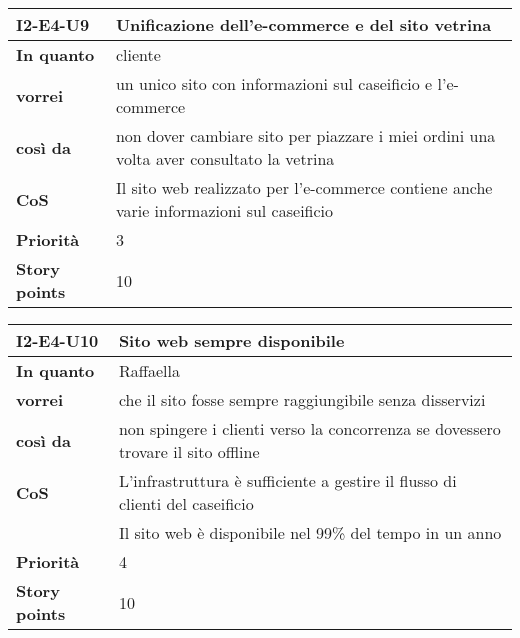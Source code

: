 \begin{table}[H]
  \begin{tabularx}{\textwidth}{lX}
    \toprule
    \textbf{I2-E4-U9} & \textbf{Unificazione dell'e-commerce e del sito vetrina} \\
    \midrule
    \textbf{In quanto} & cliente \\
    \textbf{vorrei} & un unico sito con informazioni sul caseificio e l'e-commerce \\
    \textbf{così da} & non dover cambiare sito per piazzare i miei ordini una volta aver consultato la vetrina \\
    \midrule
    \textbf{CoS} & Il sito web realizzato per l'e-commerce contiene anche varie informazioni sul caseificio \\ 
    \midrule
    \textbf{Priorità} & 3 \\
    \textbf{Story points} & 10 \\
    \bottomrule
  \end{tabularx}
  \label{user-story:i2-e4-u9}
\end{table}

\begin{table}[H]
  \begin{tabularx}{\textwidth}{lX}
    \toprule
    \textbf{I2-E4-U10} & \textbf{Sito web sempre disponibile} \\
    \midrule
    \textbf{In quanto} & Raffaella \\
    \textbf{vorrei} & che il sito fosse sempre raggiungibile senza disservizi \\
    \textbf{così da} & non spingere i clienti verso la concorrenza se dovessero trovare il sito offline \\
    \midrule
    \textbf{CoS} & L'infrastruttura è sufficiente a gestire il flusso di clienti del caseificio \\
    & Il sito web è disponibile nel 99\% del tempo in un anno \\
    \midrule
    \textbf{Priorità} & 4 \\
    \textbf{Story points} & 10 \\
    \bottomrule
  \end{tabularx}
  \label{user-story:i2-e4-u10}
\end{table}


